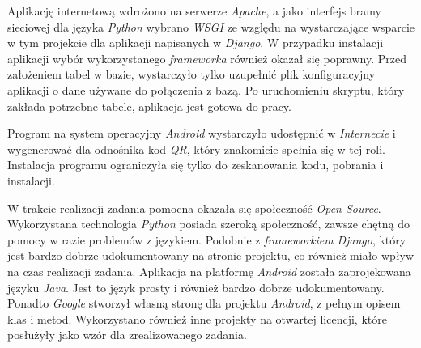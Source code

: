 Aplikację internetową wdrożono na serwerze \emph{Apache}, a jako interfejs bramy sieciowej dla języka \emph{Python} wybrano \emph{WSGI} ze względu na wystarczające wsparcie w tym projekcie dla aplikacji napisanych w \emph{Django}. W przypadku instalacji aplikacji wybór wykorzystanego \emph{frameworka} również okazał się poprawny. Przed założeniem tabel w bazie, wystarczyło tylko uzupełnić plik konfiguracyjny aplikacji o dane używane do połączenia z bazą. Po uruchomieniu skryptu, który zakłada potrzebne tabele, aplikacja jest gotowa do pracy.

Program na system operacyjny \emph{Android} wystarczyło udostępnić w \emph{Internecie} i wygenerować dla odnośnika kod \emph{QR}, który znakomicie spełnia się w tej roli. Instalacja programu ograniczyła się tylko do zeskanowania kodu, pobrania i instalacji.

W trakcie realizacji zadania pomocna okazała się społeczność \emph{Open Source}. Wykorzystana technologia \emph{Python} posiada szeroką społeczność, zawsze chętną do pomocy w razie problemów z językiem. Podobnie z \emph{frameworkiem} \emph{Django}, który jest bardzo dobrze udokumentowany na stronie projektu, co również miało wpływ na czas realizacji zadania. Aplikacja na platformę \emph{Android} została zaprojekowana języku \emph{Java}. Jest to język prosty i również bardzo dobrze udokumentowany. Ponadto \emph{Google} stworzył własną stronę dla projektu \emph{Android}, z pełnym opisem klas i metod. Wykorzystano również inne projekty na otwartej licencji, które posłużyły jako wzór dla zrealizowanego zadania.